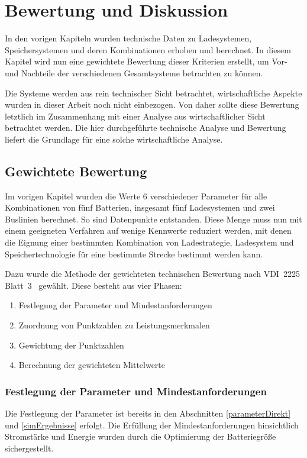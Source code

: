 \chapter{Bewertung und Diskussion} %
\label{chap5}
In den vorigen Kapiteln wurden technische Daten zu Ladesystemen, Speichersystemen und deren Kombinationen erhoben und berechnet. In diesem Kapitel wird nun eine gewichtete Bewertung dieser Kriterien erstellt, um Vor- und Nachteile der verschiedenen Gesamtsysteme betrachten zu können.

Die Systeme werden aus rein technischer Sicht betrachtet, wirtschaftliche Aspekte wurden in dieser Arbeit noch nicht einbezogen. Von daher sollte diese Bewertung letztlich im Zusammenhang mit einer Analyse aus wirtschaftlicher Sicht betrachtet werden. Die hier durchgeführte technische Analyse und Bewertung liefert die Grundlage für eine solche wirtschaftliche Analyse.

\section{Gewichtete Bewertung}
Im vorigen Kapitel wurden die Werte 6 verschiedener Parameter für alle Kombinationen von fünf Batterien, insgesamt fünf Ladesystemen und zwei Buslinien berechnet. So sind  Datenpunkte entstanden. Diese Menge muss nun mit einem geeigneten Verfahren auf wenige Kennwerte reduziert werden, mit denen die Eignung einer bestimmten Kombination von Ladestrategie, Ladesystem und Speichertechnologie für eine bestimmte Strecke bestimmt werden kann.

Dazu wurde die Methode der gewichteten technischen Bewertung nach VDI~2225 Blatt~3~\cite{vdi:2225} gewählt. Diese besteht aus vier Phasen:
\begin{enumerate}
	\item Festlegung der Parameter und Mindestanforderungen
	\item Zuordnung von Punktzahlen zu Leistungsmerkmalen
	\item Gewichtung der Punktzahlen
	\item Berechnung der gewichteten Mittelwerte
\end{enumerate}

\subsection{Festlegung der Parameter und Mindestanforderungen}
Die Festlegung der Parameter ist bereits in den Abschnitten \ref{parameterDirekt} und \ref{simErgebnisse} erfolgt. Die Erfüllung der Mindestanforderungen hinsichtlich Stromstärke und Energie wurden durch die Optimierung der Batteriegröße sichergestellt.

